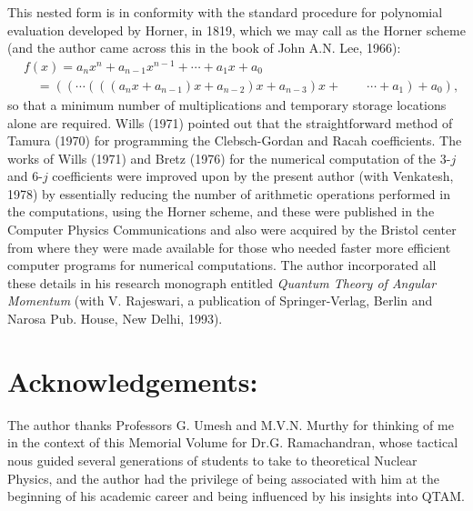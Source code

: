This nested form is in conformity with the standard procedure for polynomial evaluation developed by Horner, in 1819, which we may call as the Horner scheme (and the author came across this in the book of John A.N. Lee, 1966):
\begin{equation}
\begin{split}
& f(x) = a_nx^n + a_{n-1}x^{n-1} + \cdots + a_1x + a_0 \\
& \quad = ((\cdots (((a_nx+ a_{n-1})x + a_{n-2})x + a_{n-3})x + \qquad \cdots + a_1) + a_0), \label{chap29-eq61}
\end{split}
\end{equation}
so that a minimum number of multiplications and temporary storage locations alone are required. Wills (1971) pointed out that the straightforward method of Tamura (1970) for programming the Clebsch-Gordan and Racah coefficients. The works of Wills (1971) and Bretz (1976) for the numerical computation of the 3-$j$ and 6-$j$ coefficients were improved upon by the present author (with Venkatesh, 1978) by essentially reducing the number of arithmetic operations performed in the computations, using the Horner scheme, and these were published in the Computer Physics Communications and also were acquired by the Bristol center from where they were made available for those who needed faster more efficient computer programs for numerical computations. The author incorporated all these details in his research monograph entitled \textit{Quantum Theory of Angular Momentum} (with V. Rajeswari, a publication of Springer-Verlag, Berlin and Narosa Pub. House, New Delhi, 1993).

\section*{Acknowledgements:}

The author thanks Professors G. Umesh and M.V.N. Murthy 
for thinking of me in the context of this Memorial Volume for Dr.G. Ramachandran, whose tactical nous guided several generations of students to take to theoretical Nuclear Physics, and the author had the privilege of being associated with him at the beginning of his academic career and being influenced by his insights into QTAM.

